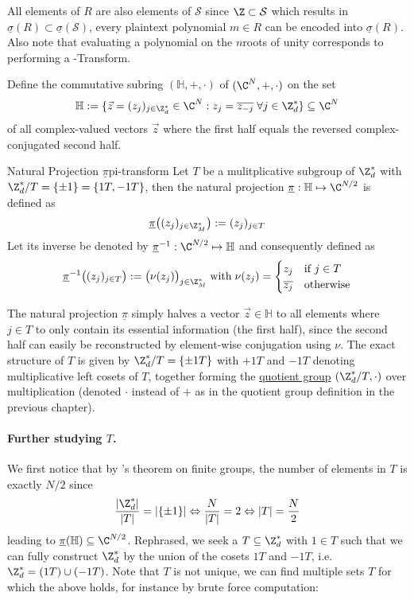 All elements of $R$ are also elements of $\mathcal{S}$ since $\Z \subset \mathcal{S}$ which results in $\underline{\sigma}(R) \subset \underline{\sigma}(\mathcal{S})$, every plaintext polynomial $m \in R$ can be encoded into $\underline{\sigma}(R)$.
Also note that evaluating a polynomial on the $n$\th roots of unity corresponds to performing a -Transform.

Define the commutative subring $(\mathbb{H}, +, \cdot)$ of $(\C^N, +, \cdot)$ on the set
$$\mathbb{H} := \{\vec{z} = (z_j)_{j \in \Z_d^*} \in \C^N : z_j = \overline{z_{-j}} \;\forall j \in \Z_d^*\} \subseteq \C^N$$
of all complex-valued vectors $\vec{z}$ where the first half equals the reversed complex-conjugated second half.

\begin{definition}{Natural Projection $\underline{\pi}$}{pi-transform}
  Let $T$ be a mulitplicative subgroup of $\Z_d^*$ with $\Z_d^* / T = \{\pm 1\} = \{1T, -1T\}$, then the natural projection $\underline{\pi}: \mathbb{H} \mapsto \C^{N/2}$ is defined as
  $$\underline{\pi}\big((z_j)_{j \in \Z_M^*}\big) := (z_j)_{j \in T}$$
  Let its inverse be denoted by $\underline{\pi}\inv: \C^{N/2} \mapsto \mathbb{H}$ and consequently defined as
  $$\underline{\pi}\inv\big((z_j)_{j \in T}\big) := \big(\nu(z_j)\big)_{j \in \Z_M^*} \; \mathrm{with} \; \nu(z_j) = \begin{cases}
      z_j            & \text{if } j \in T \\
      \overline{z_j} & \text{otherwise}
    \end{cases}$$
\end{definition}

The natural projection $\underline{\pi}$ simply halves a vector $\vec{z} \in \mathbb{H}$ to all elements where $j \in T$ to only contain its essential information (the first half), since the second half can easily be reconstructed by element-wise conjugation using $\nu$.
The exact structure of $T$ is given by $\Z_d^* / T = \{\pm 1T\}$ with $+1T$ and $-1T$ denoting multiplicative left cosets of $T$, together forming the \hyperref[def:quotient-group]{quotient group} $(\Z_d^* / T, \cdot)$ over multiplication (denoted $\cdot$ instead of $+$ as in the quotient group definition in the previous chapter).

\paragraph{Further studying $T$.}
We first notice that by 's theorem on finite groups, the number of elements in $T$ is exactly $N / 2$ since $$\frac{|\Z_d^*|}{|T|} = |\{\pm 1\}| \Leftrightarrow \frac{N}{|T|} = 2 \Leftrightarrow |T| = \frac{N}{2}$$ leading to $\underline{\pi}(\mathbb{H}) \subseteq \C^{N/2}$.
Rephrased, we seek a $T \subseteq \Z_d^*$ with $1 \in T$ such that we can fully construct $\Z_d^*$ by the union of the cosets $1T$ and $-1T$, i.e. $\Z_d^* = (1T) \cup (-1T)$.
Note that $T$ is not unique, we can find multiple sets $T$ for which the above holds, for instance by brute force computation:

